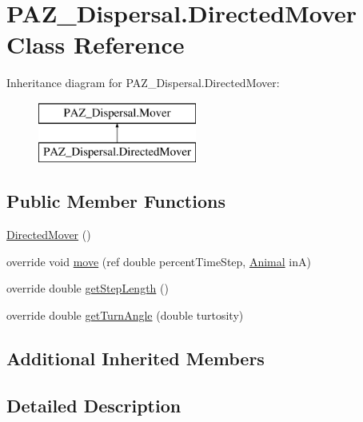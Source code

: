 \hypertarget{class_p_a_z___dispersal_1_1_directed_mover}{\section{P\-A\-Z\-\_\-\-Dispersal.\-Directed\-Mover Class Reference}
\label{class_p_a_z___dispersal_1_1_directed_mover}
}


 


Inheritance diagram for P\-A\-Z\-\_\-\-Dispersal.\-Directed\-Mover\-:\begin{figure}[H]
\begin{center}
\leavevmode
\includegraphics[height=2.000000cm]{class_p_a_z___dispersal_1_1_directed_mover}
\end{center}
\end{figure}
\subsection*{Public Member Functions}
\begin{DoxyCompactItemize}
\item 
\hyperlink{class_p_a_z___dispersal_1_1_directed_mover_a1a65d90921ac5b5920fcbdedc7518c16}{Directed\-Mover} ()
\item 
override void \hyperlink{class_p_a_z___dispersal_1_1_directed_mover_aec4cfc98555182d1be597ec4ba6b137b}{move} (ref double percent\-Time\-Step, \hyperlink{class_p_a_z___dispersal_1_1_animal}{Animal} in\-A)
\item 
override double \hyperlink{class_p_a_z___dispersal_1_1_directed_mover_a1f8637dffe393c91460711d2d0635520}{get\-Step\-Length} ()
\item 
override double \hyperlink{class_p_a_z___dispersal_1_1_directed_mover_a4e3c7d31cd78920b645b917340b0eb59}{get\-Turn\-Angle} (double turtosity)
\end{DoxyCompactItemize}
\subsection*{Additional Inherited Members}


\subsection{Detailed Description}




